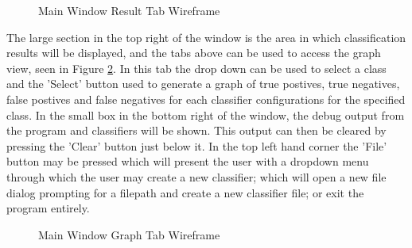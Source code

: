 \documentclass[12pt,a4paper]{article}
\begin{document}
\begin{figure}[H]
\caption{Main Window Result Tab Wireframe}
\label{mainwf}
\end{figure}
The large section in the top right of the window is the area in which classification results will be displayed, and the tabs above can be used to access the graph view, seen in Figure \ref{graphwf}. In this tab the drop down can be used to select a class and the 'Select' button used to generate a graph of true postives, true negatives, false postives and false negatives for each classifier configurations for the specified class. In the small box in the bottom right of the window, the debug output from the program and classifiers will be shown. This output can then be cleared by pressing the 'Clear' button just below it. In the top left hand corner the 'File' button may be pressed which will present the user with a dropdown menu through which the user may create a new classifier; which will open a new file dialog prompting for a filepath and create a new classifier file; or exit the program entirely.

\begin{figure}[H]
\caption{Main Window Graph Tab Wireframe}
\label{graphwf}
\end{figure}
\end{document}
